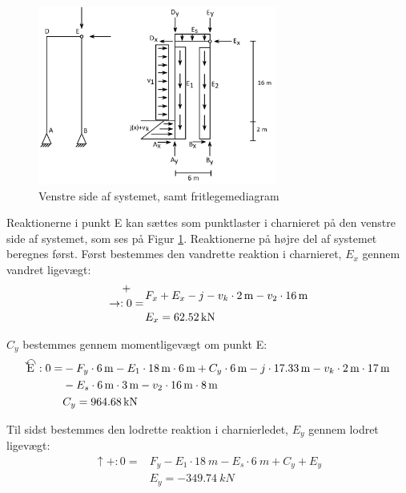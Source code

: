 \begin{figure}[H]
	\centering
	\includegraphics[width=0.7\textwidth]{billeder/venstre.png}
	\caption{Venstre side af systemet, samt fritlegemediagram}
	\label{fig:opdelingv}
\end{figure}

Reaktionerne i punkt E kan sættes som punktlaster i charnieret på den venstre side af systemet, som ses på Figur \ref{fig:opdelingv}. Reaktionerne på højre del af systemet beregnes først.
\newline
\newline
Først bestemmes den vandrette reaktion i charnieret, $E_x$ gennem vandret ligevægt: 
\begin{equation}
\begin{split}
	+\atop\rightarrow: 0 = & F_x + E_x - j - v_k \cdot \SI{2}{m} - v_2 \cdot \SI{16}{m}
	\\ &
	E_x = \SI{62,52}{kN}
\end{split}
\end{equation}

$C_y$ bestemmes gennem momentligevægt om punkt E: 
\begin{equation}
\begin{split}
	\ALN{\text{E}} :0 = & -F_y \cdot \SI{6}{m} - E_1 \cdot \SI{18}{m} \cdot \SI{6}{m} + C_y \cdot \SI{6}{m} - j \cdot \SI{17,33}{m} - v_k \cdot \SI{2}{m} \cdot \SI{17}{m} \\ & - E_s \cdot \SI{6}{m} \cdot \SI{3}{m} - v_2 \cdot \SI{16}{m} \cdot \SI{8}{m}
	\\ &
	C_y = \SI{964,68}{kN}
\end{split}
\end{equation}

Til sidst bestemmes den lodrette reaktion i charnierledet, $E_y$ gennem lodret ligevægt: 
\begin{equation}
\begin{split}
	\uparrow+: 0 = & F_y - E_1 \cdot \SI{18}{m} - E_s \cdot \SI{6}{m} + C_y + E_y
	\\ &
	E_y = \SI{-349,74}{kN}
\end{split}
\end{equation}


